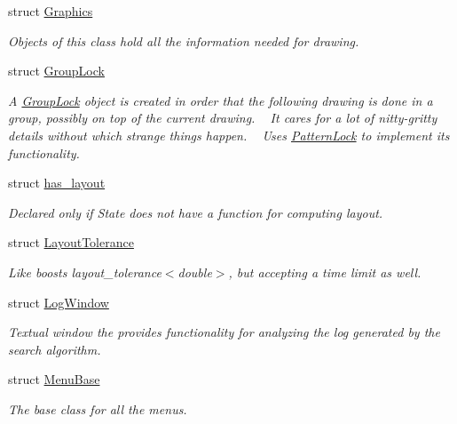 \begin{DoxyCompactItemize}
struct \hyperlink{structslb_1_1core_1_1ui_1_1Graphics}{Graphics}
\begin{DoxyCompactList}\small\item\em Objects of this class hold all the information needed for drawing. \end{DoxyCompactList}\item 
struct \hyperlink{structslb_1_1core_1_1ui_1_1GroupLock}{Group\+Lock}
\begin{DoxyCompactList}\small\item\em A \hyperlink{structslb_1_1core_1_1ui_1_1GroupLock}{Group\+Lock} object is created in order that the following drawing is done in a group, possibly on top of the current drawing. ~\newline
It cares for a lot of nitty-\/gritty details without which strange things happen. ~\newline
Uses \hyperlink{structslb_1_1core_1_1ui_1_1PatternLock}{Pattern\+Lock} to implement its functionality. \end{DoxyCompactList}\item 
struct \hyperlink{structslb_1_1core_1_1ui_1_1has__layout}{has\+\_\+layout}
\begin{DoxyCompactList}\small\item\em Declared only if {\ttfamily State} does not have a function for computing layout. \end{DoxyCompactList}\item 
struct \hyperlink{structslb_1_1core_1_1ui_1_1LayoutTolerance}{Layout\+Tolerance}
\begin{DoxyCompactList}\small\item\em Like boost\textquotesingle{}s {\ttfamily layout\+\_\+tolerance$<$double$>$}, but accepting a time limit as well. \end{DoxyCompactList}\item 
struct \hyperlink{structslb_1_1core_1_1ui_1_1LogWindow}{Log\+Window}
\begin{DoxyCompactList}\small\item\em Textual window the provides functionality for analyzing the log generated by the search algorithm. \end{DoxyCompactList}\item 
struct \hyperlink{structslb_1_1core_1_1ui_1_1MenuBase}{Menu\+Base}
\begin{DoxyCompactList}\small\item\em The base class for all the menus. \end{DoxyCompactList}\item 

\end{DoxyCompactItemize}
